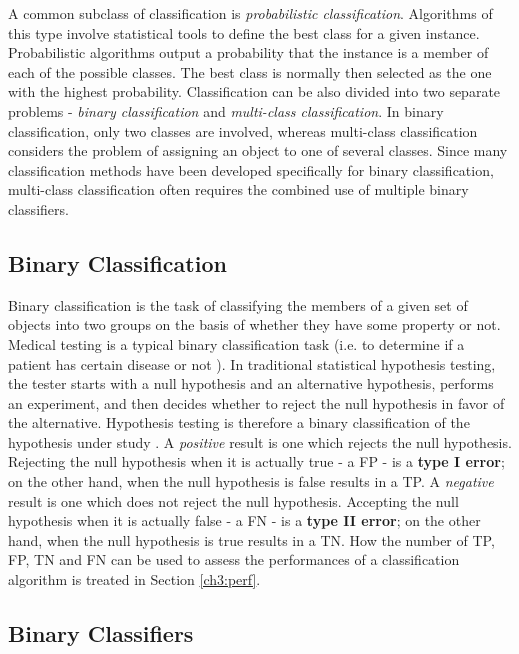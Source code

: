 A common subclass of classification is \textit{probabilistic classification}. Algorithms of this type involve statistical tools to define the best class for a given instance\cite{ML_gaussian}.
Probabilistic algorithms output a probability that the instance is a member of each of the possible classes. The best class is normally then selected as the one with the highest probability.
Classification can be also divided into two separate problems - \textit{binary classification} and \textit{multi-class classification}.
In binary classification, only two classes are involved, whereas multi-class classification considers the problem of assigning an object to one of several classes.
Since many classification methods have been developed specifically for binary classification, multi-class classification often requires the combined use of multiple binary classifiers.

\subsection{Binary Classification}

Binary classification is the task of classifying the members of a given set of objects into two groups on the basis of whether they have some property or not\cite{scholkopf2002learning}.
Medical testing is a typical binary classification task (i.e. to determine if a patient has certain disease or not ).
In traditional statistical hypothesis testing, the tester starts with a null hypothesis and an alternative hypothesis,
performs an experiment, and then decides whether to reject the null hypothesis in favor of the alternative.
Hypothesis testing is therefore a binary classification of the hypothesis under study \cite{mitchML}.
A \textit{positive} result is one which rejects the null hypothesis.
Rejecting the null hypothesis when it is actually true - a \Gls{FP} - is a \textbf{type I error};
on the other hand, when the null hypothesis is false results in a \Gls{TP}.
A \textit{negative} result is one which does not reject the null hypothesis.
Accepting the null hypothesis when it is actually false - a \Gls{FN} - is a \textbf{type II error};
on the other hand, when the null hypothesis is true results in a \Gls{TN}.
How the number of \Gls{TP}, \Gls{FP}, \Gls{TN} and \Gls{FN} can be used to assess the performances of a classification algorithm is treated in Section \ref{ch3:perf}.


\subsection{Binary Classifiers}

